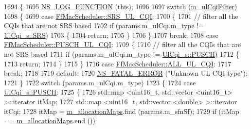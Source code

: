 \begin{DoxyCode}
1694 \{
1695   \hyperlink{log-macros-disabled_8h_a90b90d5bad1f39cb1b64923ea94c0761}{NS\_LOG\_FUNCTION} (\textcolor{keyword}{this});
1696 
1697   \textcolor{keywordflow}{switch} (\hyperlink{classns3_1_1FfMacScheduler_adae16e66a1c4231da80a1221297442cf}{m\_ulCqiFilter})
1698     \{
1699     \textcolor{keywordflow}{case} \hyperlink{classns3_1_1FfMacScheduler_aa47a9eb25f2c558c825b0be645304a52af2e0df473ba2c8f9cb131cb760591aed}{FfMacScheduler::SRS\_UL\_CQI}:
1700       \{
1701         \textcolor{comment}{// filter all the CQIs that are not SRS based}
1702         \textcolor{keywordflow}{if} (params.m\_ulCqi.m\_type != \hyperlink{structns3_1_1UlCqi__s_aece9e5ebea42eb9ff1744c72c8459b57af4b6dba4243636562c910c4d4761dd7e}{UlCqi\_s::SRS})
1703           \{
1704             \textcolor{keywordflow}{return};
1705           \}
1706       \}
1707       \textcolor{keywordflow}{break};
1708     \textcolor{keywordflow}{case} \hyperlink{classns3_1_1FfMacScheduler_aa47a9eb25f2c558c825b0be645304a52a4a833bc779439b15bd904e1dd8eaa563}{FfMacScheduler::PUSCH\_UL\_CQI}:
1709       \{
1710         \textcolor{comment}{// filter all the CQIs that are not SRS based}
1711         \textcolor{keywordflow}{if} (params.m\_ulCqi.m\_type != \hyperlink{structns3_1_1UlCqi__s_aece9e5ebea42eb9ff1744c72c8459b57a9716b20a3095c473ae3fde1eb5d0bb63}{UlCqi\_s::PUSCH})
1712           \{
1713             \textcolor{keywordflow}{return};
1714           \}
1715       \}
1716     \textcolor{keywordflow}{case} \hyperlink{classns3_1_1FfMacScheduler_aa47a9eb25f2c558c825b0be645304a52a84059a597c72335f0a5963c3efcbda71}{FfMacScheduler::ALL\_UL\_CQI}:
1717       \textcolor{keywordflow}{break};
1718 
1719     \textcolor{keywordflow}{default}:
1720       \hyperlink{group__fatal_ga5131d5e3f75d7d4cbfd706ac456fdc85}{NS\_FATAL\_ERROR} (\textcolor{stringliteral}{"Unknown UL CQI type"});
1721     \}
1722   \textcolor{keywordflow}{switch} (params.m\_ulCqi.m\_type)
1723     \{
1724     \textcolor{keywordflow}{case} \hyperlink{structns3_1_1UlCqi__s_aece9e5ebea42eb9ff1744c72c8459b57a9716b20a3095c473ae3fde1eb5d0bb63}{UlCqi\_s::PUSCH}:
1725       \{
1726         std::map <uint16\_t, std::vector <uint16\_t> >::iterator itMap;
1727         std::map <uint16\_t, std::vector <double> >::iterator itCqi;
1728         itMap = \hyperlink{classns3_1_1RrFfMacScheduler_a9554a5b41b05461bdbcd12dcdecb34ea}{m\_allocationMaps}.find (params.m\_sfnSf);
1729         \textcolor{keywordflow}{if} (itMap == \hyperlink{classns3_1_1RrFfMacScheduler_a9554a5b41b05461bdbcd12dcdecb34ea}{m\_allocationMaps}.end ())

\end{DoxyCode}
